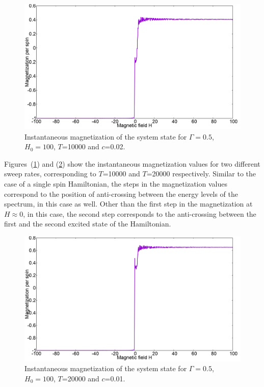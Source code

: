 \documentclass[../main.tex]{subfiles}
\begin{document}
\begin{figure}[H]
  \centering
    \includegraphics[scale=0.24]{Mag_13_H100.png}
    \caption{Instantaneous magnetization of the system state for $\Gamma=0.5$, $H_0=100$, $T$=10000 and $c$=0.02.}
  \label{fig:lz5}
 \end{figure}

Figures~(\ref{fig:lz5}) and (\ref{fig:lz6}) show the instantaneous magnetization values for two different sweep rates, corresponding to $T$=10000 and $T$=20000 respectively. Similar to the case of a single spin Hamiltonian, the steps in the magnetization values correspond to the position of anti-crossing between the energy levels of the spectrum, in this case as well. Other than the first step in the magnetization at $H \approx 0$, in this case, the second step corresponds to the anti-crossing between the first and the second excited state of the Hamiltonian.

 \begin{figure}[H]
  \centering
    \includegraphics[scale=0.24]{Mag_9_H100.png}
    \caption{Instantaneous magnetization of the system state for $\Gamma=0.5$, $H_0=100$, $T$=20000 and $c$=0.01.}
  \label{fig:lz6}
\end{figure}
\end{document}
